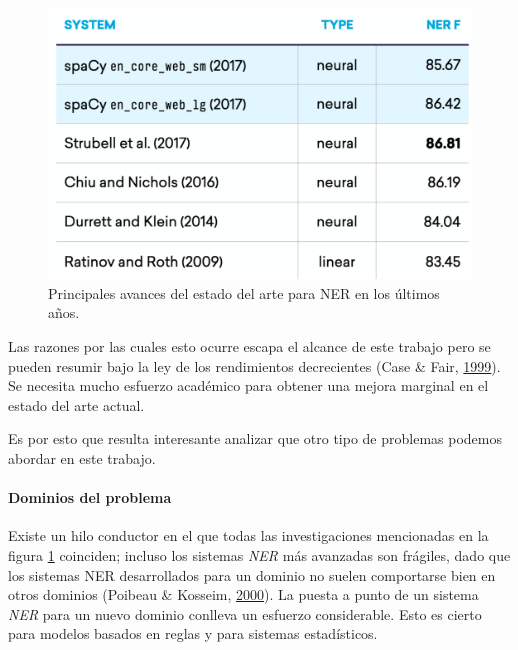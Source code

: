 \documentclass[12pt,a4paper,]{scrartcl}
\let\oldparagraph\paragraph
\renewcommand{\paragraph}[1]{\oldparagraph{#1}\mbox{}}
\begin{document}
\begin{figure}[H]

{\centering \includegraphics{assets/state-of-the-art_difficulties.pdf} 

}

\caption{Principales avances del estado del arte para NER en los últimos años.}\label{fig:spacy-algos}
\end{figure}

Las razones por las cuales esto ocurre escapa el alcance de este trabajo pero se pueden resumir bajo la ley de los rendimientos decrecientes (Case \& Fair, \protect\hyperlink{ref-lawOfDiminishingReturns}{1999}). Se necesita mucho esfuerzo académico para obtener una mejora marginal en el estado del arte actual.

Es por esto que resulta interesante analizar que otro tipo de problemas podemos abordar en este trabajo.

\hypertarget{dominios-del-problema}{%
\paragraph{Dominios del problema}\label{dominios-del-problema}}

Existe un hilo conductor en el que todas las investigaciones mencionadas en la figura \ref{fig:spacy-algos} coinciden; incluso los sistemas \emph{NER} más avanzadas son frágiles, dado que los sistemas NER desarrollados para un dominio no suelen comportarse bien en otros dominios (Poibeau \& Kosseim, \protect\hyperlink{ref-Poibeau2000ProperNE}{2000}). La puesta a punto de un sistema \emph{NER} para un nuevo dominio conlleva un esfuerzo considerable. Esto es cierto para modelos basados en reglas y para sistemas estadísticos.
\end{document}
